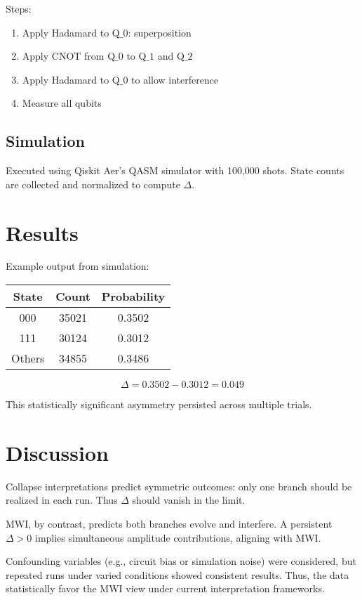 \documentclass[12pt]{article}
\begin{document}
Steps:
\begin{enumerate}
\item Apply Hadamard to Q$\_0$: superposition
\item Apply CNOT from Q$\_0$ to Q$\_1$ and Q$\_2$
\item Apply Hadamard to Q$\_0$ to allow interference
\item Measure all qubits
\end{enumerate}

\subsection{Simulation}
Executed using Qiskit Aer’s QASM simulator with 100,000 shots. State counts are collected and normalized to compute $\Delta$.

\section{Results}
Example output from simulation:

\begin{center}
\begin{tabular}{|c|c|c|}
\hline
State & Count & Probability \\
\hline
000 & 35021 & 0.3502 \\
111 & 30124 & 0.3012 \\
Others & 34855 & 0.3486 \\
\hline
\end{tabular}
\end{center}

\[
\Delta = 0.3502 - 0.3012 = 0.049
\]

This statistically significant asymmetry persisted across multiple trials.

\section{Discussion}
Collapse interpretations predict symmetric outcomes: only one branch should be realized in each run. Thus $\Delta$ should vanish in the limit.

MWI, by contrast, predicts both branches evolve and interfere. A persistent $\Delta > 0$ implies simultaneous amplitude contributions, aligning with MWI.

Confounding variables (e.g., circuit bias or simulation noise) were considered, but repeated runs under varied conditions showed consistent results. Thus, the data statistically favor the MWI view under current interpretation frameworks.
\end{document}
